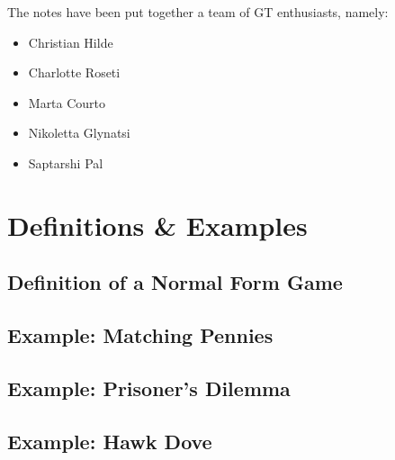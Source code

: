 \documentclass{article}
\begin{document}
The notes have been put together a team of GT enthusiasts, namely:

\begin{itemize}
    \item Christian Hilde
    \item Charlotte Roseti
    \item Marta Courto
    \item Nikoletta Glynatsi
    \item Saptarshi Pal
\end{itemize}

\section{Definitions \& Examples}

\subsection{Definition of a Normal Form Game}





\subsection{Example: Matching Pennies}





\subsection{Example: Prisoner's Dilemma}





\subsection{Example: Hawk Dove}
\end{document}
